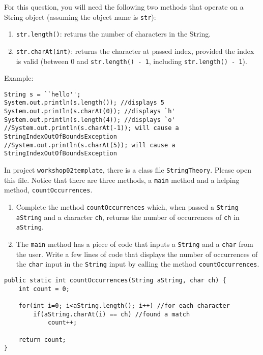 \begin{questions}
For this question, you will need the following two methods that operate on a String object (assuming the object name is \texttt{str}):

\begin{enumerate} 
\item \texttt{str.length()}: returns the number of characters in the String.
\item \texttt{str.charAt(int)}: returns the character at passed index, provided the index is valid (between 0 and \texttt{str.length() - 1}, including \texttt{str.length() - 1}).
\end{enumerate}

Example:

\begin{lstlisting}
String s = ``hello'';
System.out.println(s.length()); //displays 5
System.out.println(s.charAt(0)); //displays `h'
System.out.println(s.length(4)); //displays `o'
//System.out.println(s.charAt(-1)); will cause a StringIndexOutOfBoundsException
//System.out.println(s.charAt(5)); will cause a StringIndexOutOfBoundsException
\end{lstlisting}

In project \texttt{workshop02template}, there is a class file \texttt{StringTheory}.  Please open this file. Notice that there are three methods, a \texttt{main} method and a helping method, \texttt{countOccurrences}.

\begin{enumerate}
\item Complete the method \texttt{countOccurrences} which, when passed a \texttt{String aString} and a character \texttt{ch}, returns the number of occurrences of \texttt{ch} in \texttt{aString}.
\item The \texttt{main} method has a piece of code that inputs a \texttt{String} and a \texttt{char} from the user. Write a few lines of code that displays the number of occurrences of the \texttt{char} input in the \texttt{String} input by calling the method \texttt{countOccurrences}.
\end{enumerate}

\begin{solution}
\begin{lstlisting}
public static int countOccurrences(String aString, char ch) {
	int count = 0;

	for(int i=0; i<aString.length(); i++) //for each character
		if(aString.charAt(i) == ch) //found a match
			count++;
	
	return count;
}


\end{lstlisting}
\end{solution}
\end{questions}

